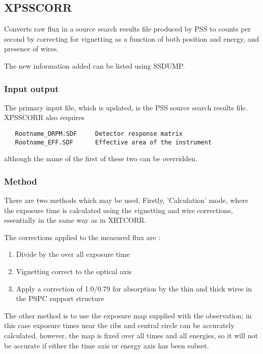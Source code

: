 \documentclass{book}
\renewcommand{\_}{{\tt\char'137}}     %
\begin{document}
\subsection{XPSSCORR}
Converts raw flux in a source search results file produced by PSS to
counts per second by correcting for vignetting as a function of both
position and energy, and presence of wires.
 
The new information added can be listed using SSDUMP.
 
\subsubsection{Input output}
The primary input file, which is updated, is the PSS source search
results file. XPSSCORR also requires
 
\begin{verbatim}
   Rootname_DRPM.SDF     Detector response matrix
   Rootname_EFF.SDF      Effective area of the instrument
\end{verbatim}
although the name of the first of these two can be overridden.
 
\subsubsection{Method}
There are two methods which may be used. Firstly, 'Calculation' mode,
where the exposure time is calculated using the vignetting and wire
corrections, essentially in the same way as in XRTCORR.
 
The corrections applied to the measured flux are :
 
\begin{enumerate}
\item Divide by the over all exposure time
\item Vignetting correct to the optical axis
\item Apply a correction of 1.0/0.79 for absorption by the
thin and thick wires in the PSPC support structure
\end{enumerate}
The other method is to use the exposure map supplied with
the observation; in this case exposure times near the ribs and
central circle can be accurately calculated, however, the map is fixed
over all times and all energies, so it will not be accurate if either
the time axis or energy axis has been subset.
 
\end{document}
